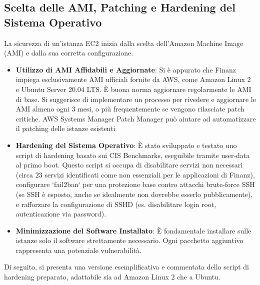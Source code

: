 \subsection{Scelta delle AMI, Patching e Hardening del Sistema Operativo}
\label{subsec:ami-hardening_cap2}
La sicurezza di un'istanza EC2 inizia dalla scelta dell'Amazon Machine Image (AMI) e dalla sua corretta configurazione.
\begin{itemize}
    \item \textbf{Utilizzo di AMI Affidabili e Aggiornate}: Si è appurato che Finanz impiega esclusivamente AMI ufficiali fornite da AWS, come Amazon Linux 2 e Ubuntu Server 20.04 LTS. È buona norma aggiornare regolarmente le AMI di base. Si suggerisce di implementare un processo per rivedere e aggiornare le AMI almeno ogni 3 mesi, o più frequentemente se vengono rilasciate patch critiche. AWS Systems Manager Patch Manager può aiutare ad automatizzare il patching delle istanze esistenti
    \item \textbf{Hardening del Sistema Operativo}: È stato sviluppato e testato uno script di hardening basato sui CIS Benchmarks, eseguibile tramite user-data al primo boot. Questo script si occupa di disabilitare servizi non necessari (circa 23 servizi identificati come non essenziali per le applicazioni di Finanz), configurare `fail2ban` per una protezione base contro attacchi brute-force SSH (se SSH è esposto, anche se idealmente non dovrebbe esserlo pubblicamente), e rafforzare la configurazione di SSHD (es. disabilitare login root, autenticazione via password).
    \item \textbf{Minimizzazione del Software Installato}: È fondamentale installare sulle istanze solo il software strettamente necessario. Ogni pacchetto aggiuntivo rappresenta una potenziale vulnerabilità.
\end{itemize}
Di seguito, si presenta una versione esemplificativa e commentata dello script di hardening preparato, adattabile sia ad Amazon Linux 2 che a Ubuntu.

